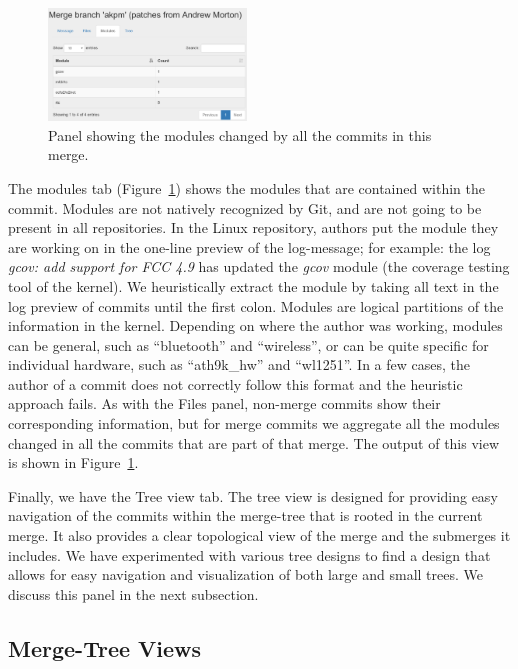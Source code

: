 \documentclass[conference, draftclsnofoot, draft]{IEEEtran}
\begin{document}
\begin{figure}
        \centering
        \includegraphics[width=0.47\textwidth]{figures/modules_view_2.png}
        \caption{Panel showing the modules changed by all the commits in this merge.}
        \label{fig:modules}
\end{figure}

The modules tab (Figure~\ref{fig:modules}) shows the modules that are contained
within the commit. Modules are not natively recognized by Git, and are not going to
be present in all repositories. In the Linux repository, authors put the module they
are working on in the one-line preview of the log-message; for example: the log
\emph{gcov: add support for FCC 4.9} has updated the \emph{gcov} module (the
coverage testing tool of the kernel). We heuristically extract the module by taking
all text in the log preview of commits until the first colon.  Modules are logical
partitions of the information in the kernel. Depending on where the author was
working, modules can be general, such as ``bluetooth'' and ``wireless'', or can be
quite specific for individual hardware, such as ``ath9k\_hw'' and ``wl1251''. In a
few cases, the author of a commit does not correctly follow this format and the
heuristic approach fails. As with the Files panel, non-merge commits show their
corresponding information, but for merge commits we aggregate all the modules
changed in all the commits that are part of that merge.  The output of this view is
shown in Figure~\ref{fig:modules}.

Finally, we have the Tree view tab. The tree view is designed for providing easy
navigation of the commits within the merge-tree that is rooted in the current merge.
It also provides a clear topological view of the merge and the submerges it
includes. We have experimented with various tree designs to find a design that
allows for easy navigation and visualization of both large and small trees. We
discuss this panel in the next subsection.

\subsection{Merge-Tree Views} \label{treeview_section}
\end{document}
